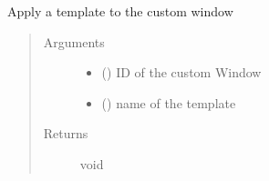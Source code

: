 \documentclass[a4paper,12pt,english]{sphinxmanual}
\begin{document}
\begin{fulllineitems}
\label{\detokenize{viewer/parameters:BIMDataViewer.setCustomWindowTemplate}}
Apply a template to the custom window
\begin{quote}\begin{description}
\item[{Arguments}] \leavevmode\begin{itemize}
\item {} 
 () \textendash{} ID of the custom Window

\item {} 
 () \textendash{} name of the template

\end{itemize}

\item[{Returns}] \leavevmode
void

\end{description}\end{quote}

\end{fulllineitems}
\end{document}

